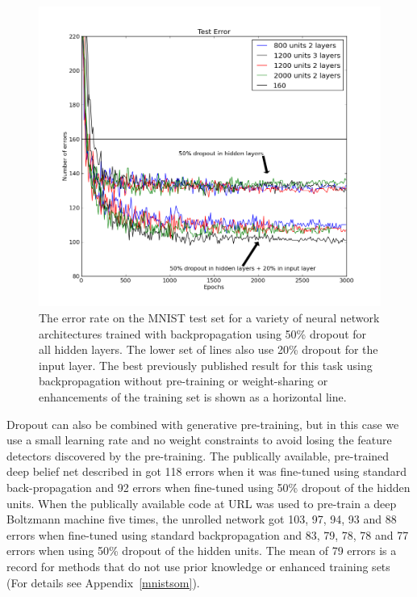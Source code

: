 \documentclass[12pt]{article}
\begin{document}
\begin{figure}[t!]
\centerline{\includegraphics[scale=0.4]{mnist.png}}
\caption{The error rate on the MNIST test set for a variety of neural network architectures
  trained with backpropagation using 50\% dropout for all hidden layers. The lower set of
  lines also use 20\% dropout
  for the input layer. The best previously published result for this task using
  backpropagation without pre-training or weight-sharing or enhancements of the training
  set is shown as a horizontal line. 
}
\label{fig:mnistplot}
\end{figure}

Dropout can also be combined with generative pre-training, but in this case we use a small
learning rate and no weight constraints to avoid losing the feature detectors discovered
by the pre-training. The publically available, pre-trained deep belief net described in
\cite{Science} got 118 errors when it was fine-tuned using standard back-propagation and
92 errors when fine-tuned using 50\% dropout of the hidden units.  When the publically
available code at URL was used to pre-train a deep Boltzmann machine five times, the
unrolled network got 103, 97, 94, 93 and 88 errors when fine-tuned using standard
backpropagation and 83, 79, 78, 78 and 77 errors when using 50\% dropout of the hidden
units. The mean of 79 errors is a record for methods that do not use prior knowledge or
enhanced training sets (For details see Appendix~\ref{mnistsom}).
\end{document}
